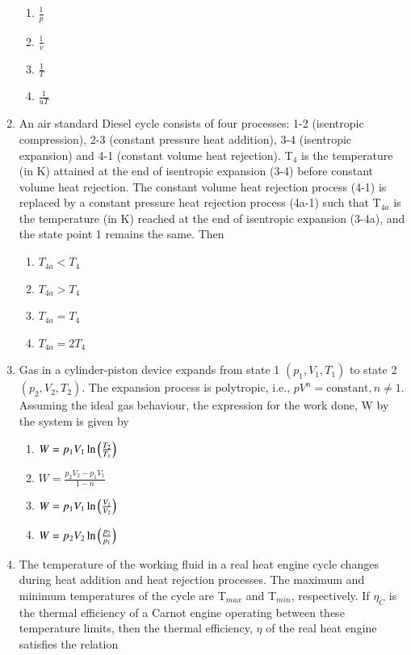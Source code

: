 \documentclass[a4paper,10pt]{article}
\begin{document}
\begin{enumerate}
\hfill{}
\begin{enumerate}
    \item $\frac{1}{p}$
    \item $\frac{1}{v}$
    \item $\frac{1}{T}$
    \item $\frac{1}{uT}$
\end{enumerate}

\item An air standard Diesel cycle consists of four processes: 1-2 (isentropic compression), 2-3 (constant pressure heat addition), 3-4 (isentropic expansion) and 4-1 (constant volume heat rejection). T$_4$ is the temperature (in K) attained at the end of isentropic expansion (3-4) before constant volume heat rejection. The constant volume heat rejection process (4-1) is replaced by a constant pressure heat rejection process (4a-1) such that T$_{4a}$ is the temperature (in K) reached at the end of isentropic expansion (3-4a), and the state point 1 remains the same. Then

\hfill{}
\begin{enumerate}
    \item $T_{4a} < T_4$
    \item $T_{4a} > T_4$
    \item $T_{4a} = T_4$
    \item $T_{4a} = 2T_4$
\end{enumerate}

\item Gas in a cylinder-piston device expands from state 1 $(p_1,V_1,T_1)$ to state 2 $(p_2,V_2,T_2)$. The expansion process is polytropic, i.e., $pV^n = \text{constant}, n \neq 1$. Assuming the ideal gas behaviour, the expression for the work done, W by the system is given by

\hfill{}
\begin{enumerate}
    \item $W = p_1V_1 \ln{\ensuremath{\left(\frac{T_2}{T_1}\right)}}$
    \item $W = \frac{p_2V_2 - p_1V_1}{1-n}$
    \item $W = p_1V_1 \ln{\ensuremath{\left(\frac{V_1}{V_2}\right)}}$
    \item $W = p_2V_2 \ln{\ensuremath{\left(\frac{p_2}{p_1}\right)}}$
\end{enumerate}

\item The temperature of the working fluid in a real heat engine cycle changes during heat addition and heat rejection processes. The maximum and minimum temperatures of the cycle are T$_{max}$ and T$_{min}$, respectively. If $\eta_C$ is the thermal efficiency of a Carnot engine operating between these temperature limits, then the thermal efficiency, $\eta$ of the real heat engine satisfies the relation


\end{enumerate}
\end{document}
